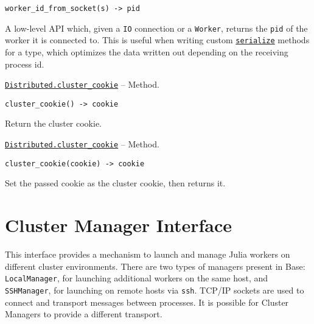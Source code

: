 \begin{adjustwidth}{2em}{0pt}


\begin{verbatim}
worker_id_from_socket(s) -> pid
\end{verbatim}

A low-level API which, given a \texttt{IO} connection or a \texttt{Worker}, returns the \texttt{pid} of the worker it is connected to. This is useful when writing custom \hyperlink{17931089632175850899}{\texttt{serialize}} methods for a type, which optimizes the data written out depending on the receiving process id.



\end{adjustwidth}
\hypertarget{914110747490695974}{} 
\hyperlink{914110747490695974}{\texttt{Distributed.cluster\_cookie}}  -- {Method.}

\begin{adjustwidth}{2em}{0pt}


\begin{verbatim}
cluster_cookie() -> cookie
\end{verbatim}

Return the cluster cookie.



\end{adjustwidth}
\hypertarget{7078615008605512632}{} 
\hyperlink{7078615008605512632}{\texttt{Distributed.cluster\_cookie}}  -- {Method.}

\begin{adjustwidth}{2em}{0pt}


\begin{verbatim}
cluster_cookie(cookie) -> cookie
\end{verbatim}

Set the passed cookie as the cluster cookie, then returns it.



\end{adjustwidth}

\hypertarget{6819108494041220011}{}


\section{Cluster Manager Interface}



This interface provides a mechanism to launch and manage Julia workers on different cluster environments. There are two types of managers present in Base: \texttt{LocalManager}, for launching additional workers on the same host, and \texttt{SSHManager}, for launching on remote hosts via \texttt{ssh}. TCP/IP sockets are used to connect and transport messages between processes. It is possible for Cluster Managers to provide a different transport.


